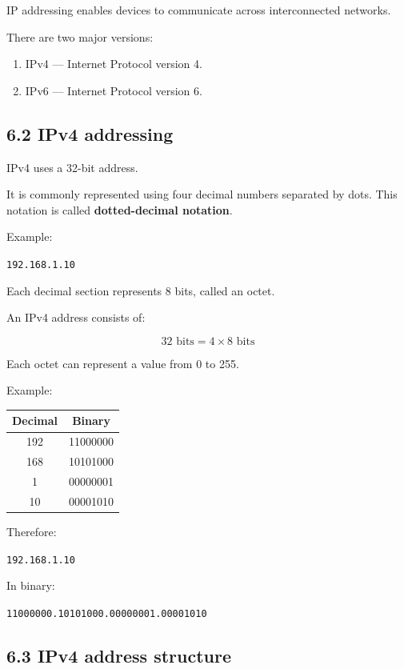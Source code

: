 IP addressing enables devices to communicate across interconnected networks.

There are two major versions:

\begin{enumerate}
    \item IPv4 — Internet Protocol version 4.
    \item IPv6 — Internet Protocol version 6.
\end{enumerate}

\subsection{6.2 IPv4 addressing}

IPv4 uses a 32-bit address.

It is commonly represented using four decimal numbers separated by dots. This notation is called \textbf{dotted-decimal notation}.

Example:

\texttt{192.168.1.10}

Each decimal section represents 8 bits, called an octet.

An IPv4 address consists of:


\[
32\text{ bits}=4\times 8\text{ bits}
\]


Each octet can represent a value from 0 to 255.

Example:

\begin{table}[htbp]
\centering
\begin{tabular}{c c}
\toprule
\textbf{Decimal} & \textbf{Binary} \\
\midrule
192 & 11000000 \\
168 & 10101000 \\
1 & 00000001 \\
10 & 00001010 \\
\bottomrule
\end{tabular}
\end{table}

Therefore:

\texttt{192.168.1.10}

In binary:

\texttt{11000000.10101000.00000001.00001010}

\subsection{6.3 IPv4 address structure}

